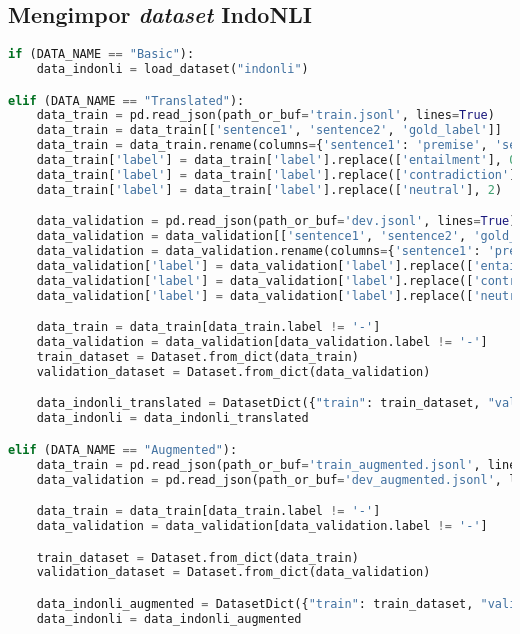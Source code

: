 \subsection{Mengimpor \emph{dataset} IndoNLI}
\begin{lstlisting}[language=Python, caption=Mengimpor \emph{dataset} IndoNLI]
if (DATA_NAME == "Basic"):
    data_indonli = load_dataset("indonli")

elif (DATA_NAME == "Translated"):
    data_train = pd.read_json(path_or_buf='train.jsonl', lines=True)
    data_train = data_train[['sentence1', 'sentence2', 'gold_label']]
    data_train = data_train.rename(columns={'sentence1': 'premise', 'sentence2': 'hypothesis', 'gold_label': 'label'})
    data_train['label'] = data_train['label'].replace(['entailment'], 0)
    data_train['label'] = data_train['label'].replace(['contradiction'], 1)
    data_train['label'] = data_train['label'].replace(['neutral'], 2)

    data_validation = pd.read_json(path_or_buf='dev.jsonl', lines=True)
    data_validation = data_validation[['sentence1', 'sentence2', 'gold_label']]
    data_validation = data_validation.rename(columns={'sentence1': 'premise', 'sentence2': 'hypothesis', 'gold_label': 'label'})
    data_validation['label'] = data_validation['label'].replace(['entailment'], 0)
    data_validation['label'] = data_validation['label'].replace(['contradiction'], 1)
    data_validation['label'] = data_validation['label'].replace(['neutral'], 2)

    data_train = data_train[data_train.label != '-']
    data_validation = data_validation[data_validation.label != '-']
    train_dataset = Dataset.from_dict(data_train)
    validation_dataset = Dataset.from_dict(data_validation)

    data_indonli_translated = DatasetDict({"train": train_dataset, "validation": validation_dataset})
    data_indonli = data_indonli_translated

elif (DATA_NAME == "Augmented"):
    data_train = pd.read_json(path_or_buf='train_augmented.jsonl', lines=True)
    data_validation = pd.read_json(path_or_buf='dev_augmented.jsonl', lines=True)

    data_train = data_train[data_train.label != '-']
    data_validation = data_validation[data_validation.label != '-']

    train_dataset = Dataset.from_dict(data_train)
    validation_dataset = Dataset.from_dict(data_validation)

    data_indonli_augmented = DatasetDict({"train": train_dataset, "validation": validation_dataset})
    data_indonli = data_indonli_augmented
\end{lstlisting}

